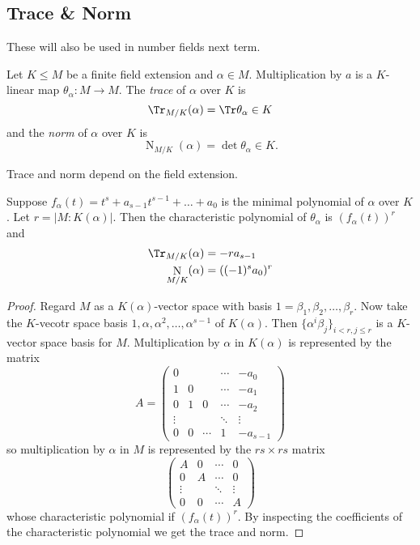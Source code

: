 \documentclass[a4paper]{article}
\DeclareMathOperator{\n}{N}
\begin{document}
\subsection{Trace \& Norm}

These will also be used in number fields next term.

\begin{definition}
  Let \(K \leq M\) be a finite field extension and \(\alpha \in M\). Multiplication by \(a\) is a \(K\)-linear map \(\theta_\alpha: M \to M\). The \emph{trace} of \(\alpha\) over \(K\) is
  \[
    \Tr_{M/K}(\alpha) = \Tr \theta_\alpha \in K
  \]
  and the \emph{norm} of \(\alpha\) over \(K\) is
  \[
    \n_{M/K}(\alpha) = \det \theta_\alpha \in K.
  \]
\end{definition}

\begin{note}
  Trace and norm depend on the field extension.
\end{note}

\begin{theorem}
  \label{thm:trace and norm}
  Suppose \(f_\alpha(t) = t^s + a_{s - 1}t^{s - 1} + \dots + a_0\) is the minimal polynomial of \(\alpha\) over \(K\). Let \(r = |M: K(\alpha)|\). Then the characteristic polynomial of \(\theta_\alpha\) is \((f_\alpha(t))^r\) and
  \begin{align*}
    \Tr_{M/K}(\alpha) &= -r a_{s-1} \\
    \n_{M/K}(\alpha) &= ((-1)^s a_0)^r
  \end{align*}
\end{theorem}

\begin{proof}
  Regard \(M\) as a \(K(\alpha)\)-vector space with basis \(1 = \beta_1, \beta_2, \dots, \beta_r\). Now take the \(K\)-vecotr space basis \(1, \alpha, \alpha^2, \dots, \alpha^{s - 1}\) of \(K(\alpha)\). Then \(\{\alpha^i \beta_j\}_{i < r, j \leq r}\) is a \(K\)-vector space basis for \(M\). Multiplication by \(\alpha\) in \(K(\alpha)\) is represented by the matrix
    \[
      A =
      \begin{pmatrix}
        0 & & & \cdots & -a_0 \\
        1 & 0 & & \cdots & -a_1 \\
        0 & 1 & 0 & \cdots & -a_2 \\
        \vdots & & & \ddots & \vdots \\
        0 & 0 & \cdots & 1 & -a_{s - 1}
      \end{pmatrix}
    \]
    so multiplication by \(\alpha\) in \(M\) is represented by the \(rs \times rs\) matrix
    \[
      \begin{pmatrix}
        A & 0 & \cdots & 0 \\
        0 & A & \cdots & 0 \\
        \vdots & & \ddots & \vdots \\
        0 & 0 & \cdots & A
      \end{pmatrix}
    \]
    whose characteristic polynomial if \((f_\alpha(t))^r\). By inspecting the coefficients of the characteristic polynomial we get the trace and norm.
\end{proof}
\end{document}
